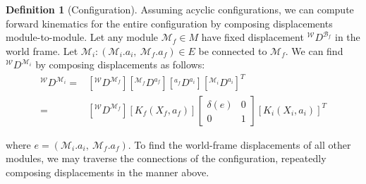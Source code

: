 \documentclass[conference]{IEEEtran}
\theoremstyle{definition}
\newtheorem{definition}{Definition}[section]
\begin{document}
\begin{definition}[Configuration]
Assuming acyclic configurations, we can compute forward kinematics for the entire
configuration by composing displacements module-to-module. Let any module \(\mathcal{M}_f \in M\) have
fixed displacement \({^\mathcal{W}}D^{\mathcal{B}_f}\) in the world frame.
Let \(\mathcal{M}_i: (\mathcal{M}_i.a_i,~\mathcal{M}_f.a_f) \in E \) be connected to \(\mathcal{M}_f\).
 We can find \({^\mathcal{W}}D^{\mathcal{M}_i}\) by composing displacements as follows:
\begin{align*}
{^\mathcal{W}}D^{\mathcal{M}_i} =& [{^\mathcal{W}}D^{\mathcal{M}_f}] [{^{\mathcal{M}_f}}D^{a_f}][
{^{a_f}}D^{a_i}] [{^{\mathcal{M}_i}}D^{a_i}]^T \\
=& [{^\mathcal{W}}D^{\mathcal{M}_f}] [K_f(X_f,a_f)] \begin{bmatrix} \delta(e) & 0
\\ 0 & 1\end{bmatrix} [K_i(X_i,a_i)]^T
\end{align*}

where \(e=(\mathcal{M}_i.a_i,~\mathcal{M}_f.a_f)\). To find the world-frame displacements
of all other modules, we may traverse the connections of the configuration,  repeatedly
composing displacements in the manner above.
\end{definition}
\end{document}
